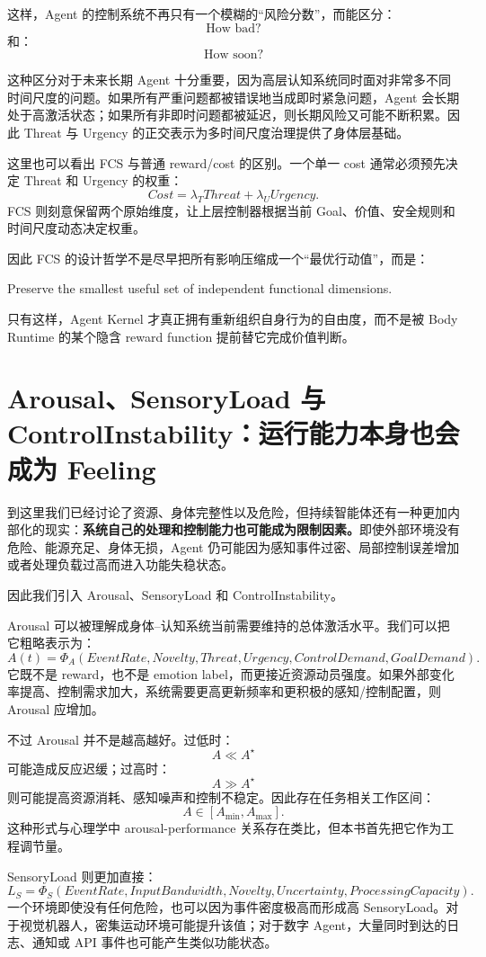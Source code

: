 这样，Agent 的控制系统不再只有一个模糊的“风险分数”，而能区分：
\[
\text{How bad?}
\]
和：
\[
\text{How soon?}
\]

这种区分对于未来长期 Agent 十分重要，因为高层认知系统同时面对非常多不同时间尺度的问题。如果所有严重问题都被错误地当成即时紧急问题，Agent 会长期处于高激活状态；如果所有非即时问题都被延迟，则长期风险又可能不断积累。因此 Threat 与 Urgency 的正交表示为多时间尺度治理提供了身体层基础。

这里也可以看出 FCS 与普通 reward/cost 的区别。一个单一 cost 通常必须预先决定 Threat 和 Urgency 的权重：
\[
Cost
=
\lambda_T Threat+\lambda_U Urgency.
\]
FCS 则刻意保留两个原始维度，让上层控制器根据当前 Goal、价值、安全规则和时间尺度动态决定权重。

因此 FCS 的设计哲学不是尽早把所有影响压缩成一个“最优行动值”，而是：
\begin{statementbox}
Preserve the smallest useful set of independent functional dimensions.
\end{statementbox}
只有这样，Agent Kernel 才真正拥有重新组织自身行为的自由度，而不是被 Body Runtime 的某个隐含 reward function 提前替它完成价值判断。

\section{Arousal、SensoryLoad 与 ControlInstability：运行能力本身也会成为 Feeling}

到这里我们已经讨论了资源、身体完整性以及危险，但持续智能体还有一种更加内部化的现实：\textbf{系统自己的处理和控制能力也可能成为限制因素。}即使外部环境没有危险、能源充足、身体无损，Agent 仍可能因为感知事件过密、局部控制误差增加或者处理负载过高而进入功能失稳状态。

因此我们引入 Arousal、SensoryLoad 和 ControlInstability。

Arousal 可以被理解成身体--认知系统当前需要维持的总体激活水平。我们可以把它粗略表示为：
\[
A(t)
=
\Phi_A
(
EventRate,
Novelty,
Threat,
Urgency,
ControlDemand,
GoalDemand
).
\]
它既不是 reward，也不是 emotion label，而更接近资源动员强度。如果外部变化率提高、控制需求加大，系统需要更高更新频率和更积极的感知/控制配置，则 Arousal 应增加。

不过 Arousal 并不是越高越好。过低时：
\[
A\ll A^\star
\]
可能造成反应迟缓；过高时：
\[
A\gg A^\star
\]
则可能提高资源消耗、感知噪声和控制不稳定。因此存在任务相关工作区间：
\[
A\in[A_{\min},A_{\max}].
\]
这种形式与心理学中 arousal-performance 关系存在类比，但本书首先把它作为工程调节量。

SensoryLoad 则更加直接：
\[
L_S
=
\Phi_S
(
EventRate,
InputBandwidth,
Novelty,
Uncertainty,
ProcessingCapacity
).
\]
一个环境即使没有任何危险，也可以因为事件密度极高而形成高 SensoryLoad。对于视觉机器人，密集运动环境可能提升该值；对于数字 Agent，大量同时到达的日志、通知或 API 事件也可能产生类似功能状态。

